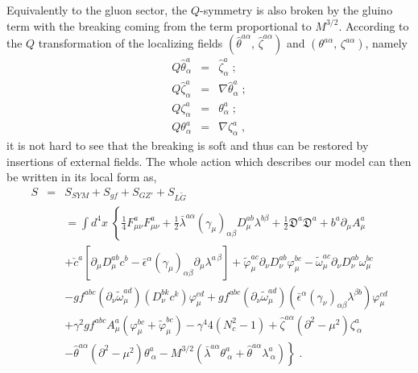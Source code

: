 \begin{appendix}
\noindent Equivalently to the gluon sector, the $Q$-symmetry is also broken by the gluino term with the breaking coming from the term proportional to $M^{3/2}$. According to the $Q$ transformation of the localizing fields $(\hat{\theta}^{a\alpha},\, \hat{\zeta}^{a\alpha})$ and $(\theta^{a\alpha},\,\zeta^{a\alpha})$, namely
\begin{eqnarray}
\label{loctrans}
Q\hat{\theta}^{a}_{\alpha} &=& \hat{\zeta}^{a}_{\alpha} \;; \nonumber \\
Q\hat{\zeta}^{a}_{\alpha} &=& \nabla\hat{\theta}^{a}_{\alpha} \;; \nonumber \\
Q\zeta^{a}_{\alpha} &=& \theta^{a}_{\alpha} \;; \nonumber \\
Q\theta^{a}_{\alpha} &=& \nabla\zeta^{a}_{\alpha}\;,
\end{eqnarray}
it is not hard to see that the breaking is soft and thus can be restored by insertions of external fields. The whole action which describes our model can then be written in its local form as, 
\begin{eqnarray}
\label{fnlact}
S &=& S_{SYM} + S_{gf} + S_{GZ'} + S_{L\tilde{G}}\nonumber \\
&&
=\int d^{4}x\; \left\{\frac{1}{4}F^{a}_{\mu \nu}F^{a}_{\mu\nu} 
+ \frac{1}{2} \bar{\lambda}^{a\alpha} (\gamma_{\mu})_{\alpha\beta} D^{ab}_{\mu}\lambda^{b\beta}
+ \frac{1}{2}\mathfrak{D}^a\mathfrak{D}^a 
+ b^{a}\partial_{\mu}A^{a}_{\mu} \right. \nonumber\\
&&
+\check{c}^{a}\left[\partial_{\mu}D^{ab}_{\mu}c^{b}
-\bar{\epsilon}^{\alpha}(\gamma_{\mu})_{\alpha\beta}\partial_{\mu}\lambda^{a\,\beta}\right]
+ \tilde{\varphi}^{ac}_{\mu}\partial_{\nu}D_{\nu}^{ab}\varphi^{bc}_{\mu} 
-\tilde{\omega}^{ac}_{\mu}\partial_{\nu}D_{\nu}^{ab}\omega^{bc}_{\mu} \nonumber \\
&&
-gf^{abc}(\partial_{\nu}\tilde{\omega}^{ad}_{\mu})(D^{bk}_{\nu}c^{k})\varphi^{cd}_{\mu}
+gf^{abc}(\partial_{\nu}\tilde{\omega}^{ad}_{\mu})(\bar{\epsilon}^\alpha(\gamma_\nu)_{\alpha\beta}\lambda^{\beta b})\varphi^{cd}_{\mu} \nonumber \\
&&
+\gamma^{2}gf^{abc}A^{a}_{\mu}(\varphi^{bc}_{\mu} + \tilde{\varphi}^{bc}_{\mu}) 
-\gamma^{4}4(N_{c}^{2}-1) 
+\hat{\zeta}^{a\alpha} (\partial^{2} - \mu^{2})\zeta^{a}_{~\alpha} \nonumber \\
&&
\left.
-\hat{\theta}^{a\alpha}(\partial^{2} - \mu^{2})\theta^{a}_{~\alpha} 
-M^{3/2}(\bar{\lambda}^{a\alpha}\theta^{a}_{~\alpha} 
+\hat{\theta}^{a\alpha}\lambda^{a}_{~\alpha})
\right\}\;.
\end{eqnarray}

\end{appendix}
